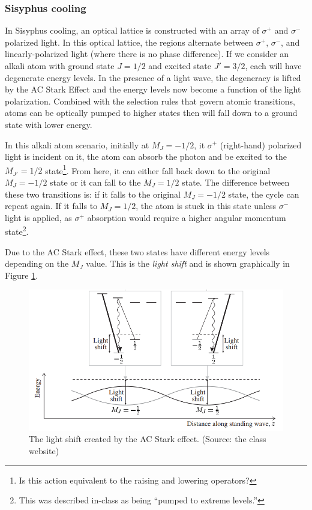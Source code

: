\documentclass{homework}
\begin{document}
	\subsubsection*{Sisyphus cooling}
	In Sisyphus cooling, an optical lattice is constructed with an array of $\sigma^+$ and $\sigma^-$ polarized light. In this optical lattice, the regions alternate between $\sigma^+$, $\sigma^-$, and linearly-polarized light (where there is no phase difference). If we consider an alkali atom with ground state $J=1/2$ and excited state $J'=3/2$, each will have degenerate energy levels. In the presence of a light wave, the degeneracy is lifted by the AC Stark Effect and the energy levels now become a function of the light polarization. Combined with the selection rules that govern atomic transitions, atoms can be optically pumped to higher states then will fall down to a ground state with lower energy.
	
	In this alkali atom scenario, initially at $M_J=-1/2$, it $\sigma^+$ (right-hand) polarized light is incident on it, the atom can absorb the photon and be excited to the $M_{J'}=1/2$ state\footnote{Is this action equivalent to the raising and lowering operators?}. From here, it can either fall back down to the original $M_J=-1/2$ state or it can fall to the $M_J=1/2$ state. The difference between these two transitions is: if it falls to the original $M_J=-1/2$ state, the cycle can repeat again. If it falls to $M_J=1/2$, the atom is stuck in this state unless $\sigma^-$ light is applied, as $\sigma^+$ absorption would require a higher angular momentum state\footnote{This was described in-class as being ``pumped to extreme levels.''}.
	
	Due to the AC Stark effect, these two states have different energy levels depending on the $M_J$ value. This is the \textit{light shift} and is shown graphically in Figure \ref{fig:finalsisy}.

	\begin{figure}[h]
		\centering
		\includegraphics[width=0.7\linewidth]{final_sisy}
		\caption{The light shift created by the AC Stark effect. (Source: the class website)}
		\label{fig:finalsisy}
	\end{figure}
	
\end{document}
